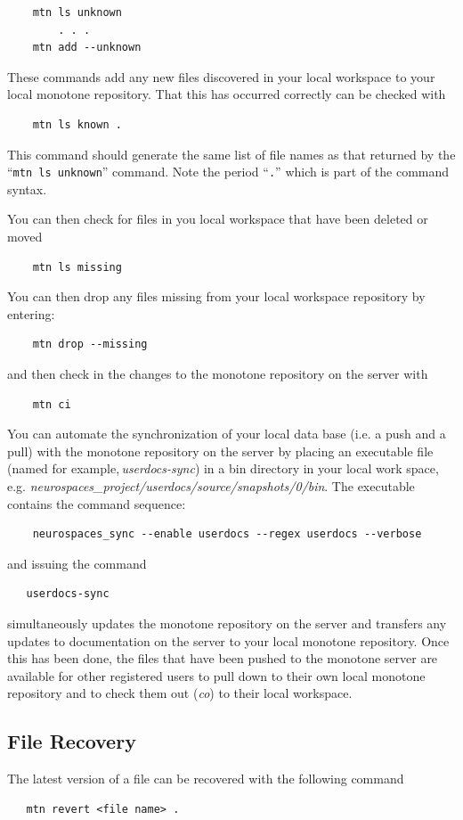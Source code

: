 \documentclass[12pt]{article}
\begin{document}
\begin{verbatim}
    mtn ls unknown
        . . .
    mtn add --unknown
\end{verbatim}
These commands add any new files discovered in your local workspace to your local monotone repository. That this has occurred correctly can be checked with
\begin{verbatim}
    mtn ls known .
\end{verbatim}
This command should generate the same list of file names as that returned by the ``{\tt mtn ls unknown}'' command. Note the period ``{\tt .}'' which is part of the command syntax.

You can then check for files in you local workspace that have been deleted or moved
\begin{verbatim}
    mtn ls missing
\end{verbatim}
You can then drop any files missing from your local workspace repository by entering:
\begin{verbatim}
    mtn drop --missing
\end{verbatim}
and then check in the changes to the monotone repository on the server with
\begin{verbatim}
    mtn ci
\end{verbatim}
You can automate the synchronization of your local data base (i.e. a push and a pull) with the monotone repository on the server by placing an executable file (named for example,\,{\it userdocs-sync}) in a bin directory in your local work space, e.g. {\it neurospaces\_project/userdocs/source/snapshots/0/bin}. 
The executable contains the command sequence:
\begin{verbatim}
    neurospaces_sync --enable userdocs --regex userdocs --verbose
\end{verbatim}
and issuing the command
\begin{verbatim}
   userdocs-sync
\end{verbatim}
simultaneously updates the monotone repository on the server and transfers any updates to documentation on the server to your local monotone repository. Once this has been done, the files that have been pushed to the monotone server are available for other registered users to pull down to their own local monotone repository and to check them out ({\it co}) to their local workspace.

\subsection*{File Recovery}

The latest version of a file can be recovered with the following command
\begin{verbatim}
   mtn revert <file name> .
\end{verbatim}
\end{document}
